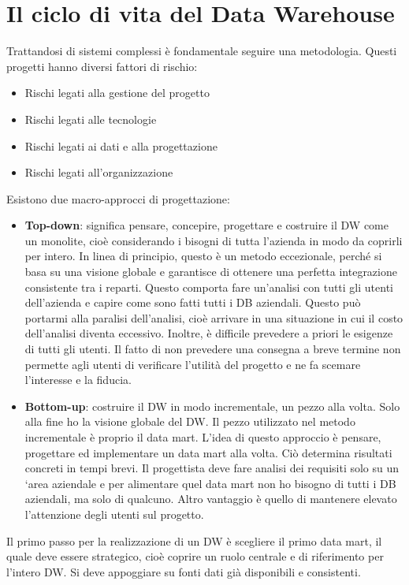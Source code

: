 	\section{Il ciclo di vita del Data Warehouse}
Trattandosi di sistemi complessi è fondamentale seguire una metodologia. Questi progetti hanno diversi fattori di rischio:
\begin{itemize}
	\item
	Rischi legati alla gestione del progetto
	\item 
	Rischi legati alle tecnologie
	\item 
	Rischi legati ai dati e alla progettazione
	\item 
	Rischi legati all'organizzazione
\end{itemize}
Esistono due macro-approcci di progettazione:
\begin{itemize}
	\item 
	\textbf{Top-down}: significa pensare, concepire, progettare e costruire il DW come un monolite, cioè considerando i bisogni di tutta l’azienda in modo da coprirli per intero. In linea di principio, questo è un metodo eccezionale, perché si basa su una visione globale e garantisce di ottenere una perfetta integrazione consistente tra i reparti. Questo comporta fare un’analisi con tutti gli utenti dell’azienda e  capire come sono fatti tutti i DB aziendali. Questo può portarmi alla paralisi dell’analisi, cioè  arrivare in una situazione in cui il costo dell’analisi diventa eccessivo. Inoltre, è difficile prevedere a priori le esigenze di tutti gli utenti. Il fatto di non prevedere una consegna a breve termine non permette agli utenti di verificare l’utilità del progetto e ne fa scemare l’interesse e la fiducia. 
	\item 
	\textbf{Bottom-up}: costruire il DW in modo incrementale, un pezzo alla volta. Solo alla fine ho la visione globale del DW. Il pezzo utilizzato nel metodo incrementale è proprio il data mart. L’idea di questo approccio è pensare, progettare ed implementare un data mart alla volta. Ciò determina risultati concreti in tempi brevi. Il progettista deve fare analisi dei requisiti solo su un ‘area aziendale e per alimentare quel data mart non ho bisogno di tutti i DB aziendali, ma solo di qualcuno. Altro vantaggio è quello di mantenere elevato l’attenzione degli utenti sul progetto.
\end{itemize}

Il primo passo per la realizzazione di un DW è scegliere il primo data mart, il quale deve essere strategico, cioè coprire un ruolo centrale e di riferimento per l’intero DW. Si deve appoggiare su fonti dati già disponibili e consistenti. 

